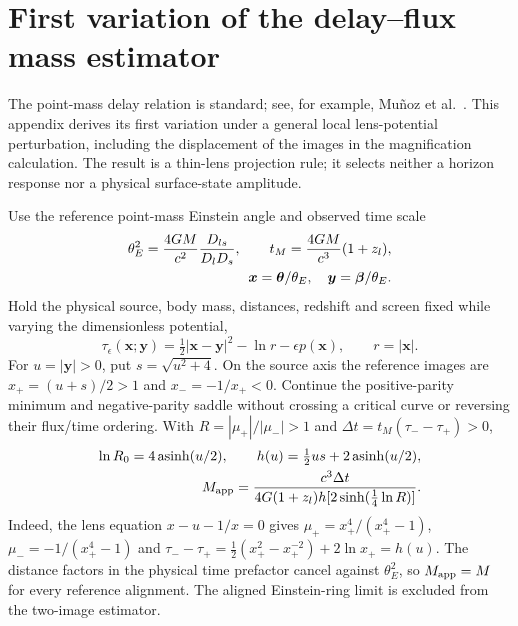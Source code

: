 \section{First variation of the delay--flux mass estimator}
\label{app:estimator-variation}

The point-mass delay relation is standard; see, for example,
Mu\~noz et al.~\cite{Munoz2016}. This appendix derives its first variation
under a general local lens-potential perturbation, including the displacement
of the images in the magnification calculation. The result is a thin-lens
projection rule; it selects neither a horizon response nor a physical
surface-state amplitude.

Use the reference point-mass Einstein angle and observed time scale
\begin{align}
 \theta_E^2=\frac{4GM}{c^2}\frac{D_{ls}}{D_lD_s},
 \qquad t_M=\frac{4GM}{c^3}(1+z_l),\notag\\
 \qquad \boldsymbol x=\boldsymbol\theta/\theta_E,
 \quad \boldsymbol y=\boldsymbol\beta/\theta_E.
 \label{eq:estimator-scales}
\end{align}
Hold the physical source, body mass, distances, redshift and screen fixed
while varying the dimensionless potential,
\begin{equation}
 \tau_\epsilon(\boldsymbol x;\boldsymbol y)
 =\tfrac12|\boldsymbol x-\boldsymbol y|^2-\ln r
  -\epsilon p(\boldsymbol x),\qquad r=|\boldsymbol x|.
 \label{eq:estimator-fermat}
\end{equation}
For $u=|\boldsymbol y|>0$, put $s=\sqrt{u^2+4}$. On the source axis the
reference images are $x_+=(u+s)/2>1$ and $x_-=-1/x_+<0$. Continue the
positive-parity minimum and negative-parity saddle without crossing a
critical curve or reversing their flux/time ordering. With
$R=|\mu_+|/|\mu_-|>1$ and $\Delta t=t_M(\tau_--\tau_+)>0$,
\begin{align}
 \ln R_0=4\operatorname{asinh}(u/2),\qquad
 h(u)=\tfrac12us+2\operatorname{asinh}(u/2),\notag\\
 M_{\rm app}=\frac{c^3\Delta t}
 {4G(1+z_l)h[2\sinh(\tfrac14\ln R)]}.
 \label{eq:estimator-standard}
\end{align}
Indeed, the lens equation $x-u-1/x=0$ gives
$\mu_+=x_+^4/(x_+^4-1)$, $\mu_-=-1/(x_+^4-1)$ and
$\tau_--\tau_+=\tfrac12(x_+^2-x_+^{-2})+2\ln x_+=h(u)$.
The distance factors in the physical time prefactor cancel against
$\theta_E^2$, so $M_{\rm app}=M$ for every reference alignment. The
aligned Einstein-ring limit is excluded from the two-image estimator.

